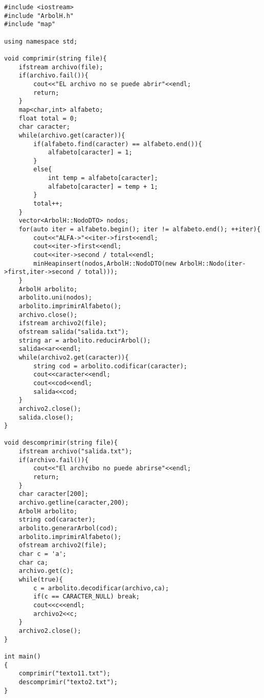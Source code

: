 \documentclass[a4paper,12pt]{article}
\begin{document}
    \begin{lstlisting}
#include <iostream>
#include "ArbolH.h"
#include "map"

using namespace std;

void comprimir(string file){
    ifstream archivo(file);
    if(archivo.fail()){
        cout<<"EL archivo no se puede abrir"<<endl;
        return;
    }
    map<char,int> alfabeto;
    float total = 0;
    char caracter;
    while(archivo.get(caracter)){
        if(alfabeto.find(caracter) == alfabeto.end()){
            alfabeto[caracter] = 1;
        }
        else{
            int temp = alfabeto[caracter];
            alfabeto[caracter] = temp + 1;
        }
        total++;
    }
    vector<ArbolH::NodoDTO> nodos;
    for(auto iter = alfabeto.begin(); iter != alfabeto.end(); ++iter){
        cout<<"ALFA->"<<iter->first<<endl;
        cout<<iter->first<<endl;
        cout<<iter->second / total<<endl;
        minHeapinsert(nodos,ArbolH::NodoDTO(new ArbolH::Nodo(iter->first,iter->second / total)));
    }
    ArbolH arbolito;
    arbolito.uni(nodos);
    arbolito.imprimirAlfabeto();
    archivo.close();
    ifstream archivo2(file);
    ofstream salida("salida.txt");
    string ar = arbolito.reducirArbol();
    salida<<ar<<endl;
    while(archivo2.get(caracter)){
        string cod = arbolito.codificar(caracter);
        cout<<caracter<<endl;
        cout<<cod<<endl;
        salida<<cod;
    }
    archivo2.close();
    salida.close();
}

void descomprimir(string file){
    ifstream archivo("salida.txt");
    if(archivo.fail()){
        cout<<"El archvibo no puede abrirse"<<endl;
        return;
    }
    char caracter[200];
    archivo.getline(caracter,200);
    ArbolH arbolito;
    string cod(caracter);
    arbolito.generarArbol(cod);
    arbolito.imprimirAlfabeto();
    ofstream archivo2(file);
    char c = 'a';
    char ca;
    archivo.get(c);
    while(true){
        c = arbolito.decodificar(archivo,ca);
        if(c == CARACTER_NULL) break;
        cout<<c<<endl;
        archivo2<<c;
    }
    archivo2.close();
}

int main()
{
    comprimir("texto11.txt");
    descomprimir("texto2.txt");
}

    \end{lstlisting}
\end{document}
